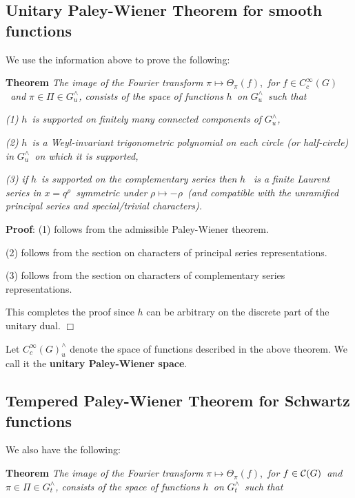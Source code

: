 \documentclass[11pt, a4paper]{article}
\begin{document}
\subsection{Unitary Paley-Wiener Theorem for smooth functions}

We use the information above to prove the following:

{\bf Theorem} {\em The image of the Fourier transform }$\pi \longmapsto
\Theta _\pi (f)$,{\em \ for }$f\in C_c^\infty (G)${\em \ and }$\pi \in \Pi
\in G_u^{\wedge }${\em , consists of the space of functions }$h${\em \ on }$%
G_u^{\wedge }${\em \ such that}

{\em (1) }$h${\em \ is supported on finitely many connected components of }$%
G_u^{\wedge }${\em ,}

{\em (2) }$h${\em \ is a Weyl-invariant trigonometric polynomial on each circle (or
half-circle) in }$G_u^{\wedge }${\em \ on which it is supported,}

{\em (3) if }$h${\em \ is supported on the complementary series then }$h$%
{\em \ is a finite Laurent series in }$x=q^\rho ${\em \ symmetric under }$\rho \longmapsto -\rho ${\em \ (and compatible with the unramified principal series and special/trivial characters).}

{\bf Proof}: (1) follows from the admissible Paley-Wiener theorem.

(2) follows from the section on characters of principal series
representations.

(3) follows from the section on characters of complementary series
representations.

This completes the proof since $h$ can be arbitrary on the discrete part of
the unitary dual. $\Box $

Let $C_c^\infty (G)_u^{\wedge }$ denote the space of functions described in
the above theorem. We call it the {\bf unitary Paley-Wiener space}.

\subsection{Tempered Paley-Wiener Theorem for Schwartz functions}

We also have the following:

{\bf Theorem} {\em The image of the Fourier transform }$\pi \longmapsto
\Theta _\pi (f)$,{\em \ for }$f\in {\cal C}(G)${\em \ and }$\pi \in \Pi \in
G_t^{\wedge }${\em , consists of the space of functions }$h${\em \ on }$%
G_t^{\wedge }${\em \ such that}
\end{document}
